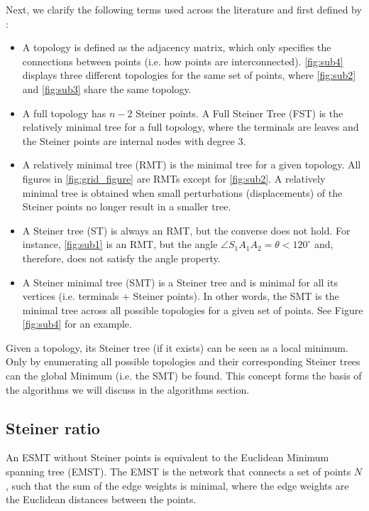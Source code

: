 \documentclass{l4proj}
\begin{document}
Next, we clarify the following terms used across the literature and first defined by \cite{Gilbert1968SteinerMT}:
\begin{itemize}
    \item A topology is defined as the adjacency matrix, which only specifies the connections between points (i.e. how points are interconnected). \ref{fig:sub4} displays three different topologies for the same set of points, where \ref{fig:sub2} and \ref{fig:sub3} share the same topology.
    \item \label{prop:fst_definition} A full topology has $n - 2$ Steiner points. A Full Steiner Tree (FST) is the relatively minimal tree for a full topology, where the terminals are leaves and the Steiner points are internal nodes with degree 3.
    \item A relatively minimal tree (RMT) is the minimal tree for a given topology. All figures in \ref{fig:grid_figure} are RMTs except for \ref{fig:sub2}. A relatively minimal tree is obtained when small perturbations (displacements) of the Steiner points no longer result in a smaller tree.
    \item  A Steiner tree (ST) is always an RMT, but the converse does not hold. For instance, \ref{fig:sub1} is an RMT, but the angle $\angle S_1A_1A_2 = \theta < 120^\circ$ and, therefore, does not satisfy the angle property.
    \item A Steiner minimal tree (SMT) is a Steiner tree and is minimal for all its vertices (i.e. terminals + Steiner points). In other words, the SMT is the minimal tree across all possible topologies for a given set of points. See Figure \ref{fig:sub4} for an example.
\end{itemize}

Given a topology, its Steiner tree (if it exists) can be seen as a local minimum. Only by enumerating all possible topologies and their corresponding Steiner trees can the global Minimum (i.e. the SMT) be found. This concept forms the basis of the algorithms we will discuss in the algorithms section.

\subsection{Steiner ratio}
\label{sec:esmt_steiner_ratio}
An ESMT without Steiner points is equivalent to the Euclidean Minimum spanning tree (EMST). The EMST is the network that connects a set of points $N$, such that the sum of the edge weights is minimal, where the edge weights are the Euclidean distances between the points.
\end{document}
